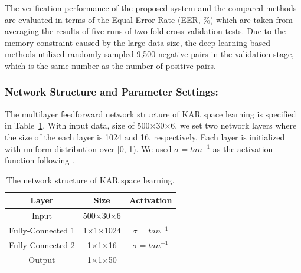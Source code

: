 \documentclass{sig-alternate-05-2015}
\begin{document}
The verification performance of the proposed system and the compared methods are evaluated in terms of the Equal Error Rate (EER, \%) which are taken from averaging the results of five runs of two-fold cross-validation tests. Due to the memory constraint caused by the large data size, the deep learning-based methods utilized randomly sampled 9,500 negative pairs in the validation stage, which is the same number as the number of positive pairs.

\subsubsection{Network Structure and Parameter Settings:}
The multilayer feedforward network structure of KAR space learning is specified in Table~\ref{tab2}. With input data, size of 500$\times$30$\times$6, we set two network layers where the size of the each layer is 1024 and 16, respectively. Each layer is initialized with uniform distribution over [0, 1). We used $\sigma = {tan}^{-1}$ as the activation function following \cite{toh2018analytic}.
\begin{table}
\centering
    \caption{The network structure of KAR space learning.}
    \label{tab2}
    \begin{tabular}{|c|c|c|} \hline
     Layer   & Size     & Activation \\ \hline
     Input   & 500$\times$30$\times$6 &            \\ \hline
     Fully-Connected 1 & 1$\times$1$\times$1024 & $\sigma = {tan}^{-1}$     \\ \hline
     Fully-Connected 2 & 1$\times$1$\times$16  & $\sigma = {tan}^{-1}$     \\ \hline
     Output  & 1$\times$1$\times$50   &            \\\hline
    \end{tabular}
\end{table}
\end{document}

